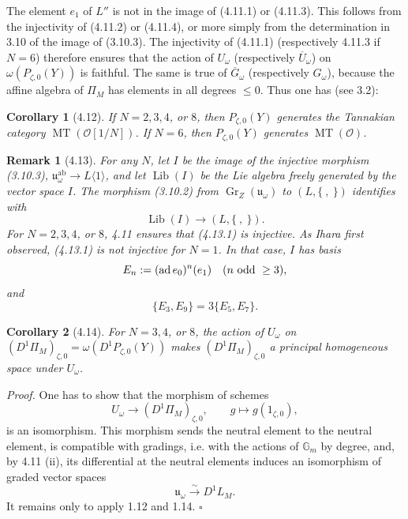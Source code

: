 \documentclass[10pt,a4paper]{article}
\newcommand{\Gm}{\mathbb G_m}
\newcommand{\MT}{\operatorname{MT}}
\newcommand{\Gr}{\operatorname{Gr}}
\newcommand{\ad}{\operatorname{ad}}
\newcommand{\OO}{\mathcal O}
\newcommand{\uomega}{\mathfrak u_\omega}
\theoremstyle{deligne}
\newtheorem*{corollary*}{Corollary}
\newtheorem*{remark*}{Remark}
\newenvironment{proofdel}{\textit{Proof.}}{\hfill$\square$}
\begin{document}
The element \(e_1\) of \(L''\) is not in the image of (4.11.1) or (4.11.3). This follows from the injectivity of (4.11.2) or (4.11.4), or more simply from the determination in 3.10 of the image of (3.10.3). The injectivity of (4.11.1) (respectively 4.11.3 if \(N=6\)) therefore ensures that the action of \(U_\omega\) (respectively \(\overline U_\omega\)) on \(\omega(P_{\zeta,0}(Y))\) is faithful. The same is true of \(\overline G_\omega\) (respectively \(G_\omega\)), because the affine algebra of \(\Pi_M\) has elements in all degrees \(\le0\). Thus one has (see 3.2):

\begin{corollary*}[4.12]
If \(N=2,3,4\), or \(8\), then \(P_{\zeta,0}(Y)\) generates the Tannakian category \(\MT(\OO[1/N])\). If \(N=6\), then \(P_{\zeta,0}(Y)\) generates \(\MT(\OO)\).
\end{corollary*}

\begin{remark*}[4.13]
For any \(N\), let \(I\) be the image of the injective morphism (3.10.3), \(\uomega^{\mathrm{ab}}\to L\langle1\rangle\), and let \(\operatorname{Lib}(I)\) be the Lie algebra freely generated by the vector space \(I\). The morphism (3.10.2) from \(\Gr_Z(\uomega)\) to \((L,\{\ ,\ \})\) identifies with
\[
\tag{4.13.1}
\operatorname{Lib}(I)\longrightarrow(L,\{\ ,\ \}).
\]
For \(N=2,3,4\), or \(8\), 4.11 ensures that (4.13.1) is injective. As Ihara first observed, (4.13.1) is not injective for \(N=1\). In that case, \(I\) has basis
\[
E_n:=(\ad e_0)^n(e_1)\quad(n\hbox{ odd }\ge3),
\]
and
\[
\{E_3,E_9\}=3\{E_5,E_7\}.
\]
\end{remark*}

\begin{corollary*}[4.14]
For \(N=3,4\), or \(8\), the action of \(U_\omega\) on \((D^1\Pi_M)_{\zeta,0}=\omega(D^1P_{\zeta,0}(Y))\) makes \((D^1\Pi_M)_{\zeta,0}\) a principal homogeneous space under \(U_\omega\).
\end{corollary*}

\begin{proofdel}
One has to show that the morphism of schemes
\[
\tag{4.14.1}
U_\omega\longrightarrow(D^1\Pi_M)_{\zeta,0},\qquad g\longmapsto g(1_{\zeta,0}),
\]
is an isomorphism. This morphism sends the neutral element to the neutral element, is compatible with gradings, i.e. with the actions of \(\Gm\) by degree, and, by 4.11 (ii), its differential at the neutral elements induces an isomorphism of graded vector spaces
\[
\tag{4.14.2}
\uomega\overset{\sim}{\longrightarrow}D^1L_M.
\]
It remains only to apply 1.12 and 1.14.
\end{proofdel}
\end{document}
